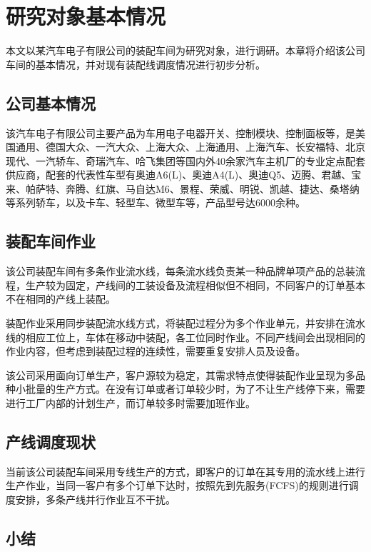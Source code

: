 \chapter{研究对象基本情况}
本文以某汽车电子有限公司的装配车间为研究对象，进行调研。本章将介绍该公司车间的基本情况，并对现有装配线调度情况进行初步分析。
\section{公司基本情况}
该汽车电子有限公司主要产品为车用电子电器开关、控制模块、控制面板等，是美国通用、德国大众、一汽大众、上海大众、上海通用、上海汽车、长安福特、北京现代、一汽轿车、奇瑞汽车、哈飞集团等国内外40余家汽车主机厂的专业定点配套供应商，配套的代表性车型有奥迪A6(L)、奥迪A4(L)、奥迪Q5、迈腾、君越、宝来、帕萨特、奔腾、红旗、马自达M6、景程、荣威、明锐、凯越、捷达、桑塔纳等系列轿车，以及卡车、轻型车、微型车等，产品型号达6000余种。

\section{装配车间作业}
该公司装配车间有多条作业流水线，每条流水线负责某一种品牌单项产品的总装流程，生产较为固定，产线间的工装设备及流程相似但不相同，不同客户的订单基本不在相同的产线上装配。

装配作业采用同步装配流水线方式，将装配过程分为多个作业单元，并安排在流水线的相应工位上，车体在移动中装配，各工位同时作业。不同产线间会出现相同的作业内容，但考虑到装配过程的连续性，需要重复安排人员及设备。

该公司采用面向订单生产，客户源较为稳定，其需求特点使得装配作业呈现为多品种小批量的生产方式。在没有订单或者订单较少时，为了不让生产线停下来，需要进行工厂内部的计划生产，而订单较多时需要加班作业。

\section{产线调度现状}
当前该公司装配车间采用专线生产的方式，即客户的订单在其专用的流水线上进行生产作业，当同一客户有多个订单下达时，按照先到先服务(FCFS)的规则进行调度安排，多条产线并行作业互不干扰。

\section{小结}